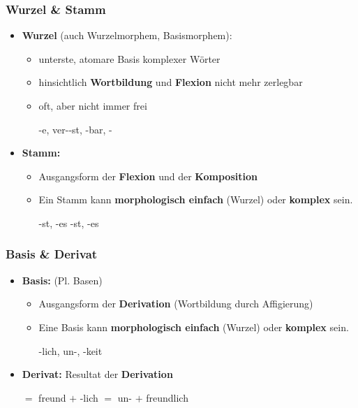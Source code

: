 \begin{frame}
\frametitle{Wurzel \& Stamm}

\begin{itemize}
	\item \textbf{Wurzel} (auch Wurzelmorphem, Basismorphem): 
	
	\begin{itemize}
		\item unterste, atomare Basis komplexer Wörter
		\item hinsichtlich \textbf{Wortbildung} und \textbf{Flexion} nicht mehr zerlegbar
		\item oft, aber nicht immer frei
		
		\ea {}-e, ver--st, -bar, -				
		\z 
	\end{itemize}


	\item \textbf{Stamm:}
	
	\begin{itemize}
		\item Ausgangsform der \textbf{Flexion} und der \textbf{Komposition}
		\item Ein Stamm kann \textbf{morphologisch einfach} (Wurzel) oder \textbf{komplex} sein.
	
		\ea 
			\ea {}-st, -es
			\ex {}-st, -es
			\z 
		\z 
	\end{itemize}
\end{itemize}

\end{frame}


\begin{frame}
\frametitle{Basis \& Derivat}

\begin{itemize}
	\item \textbf{Basis:} (Pl. Basen)
	
	\begin{itemize}
		\item Ausgangsform der \textbf{Derivation} (Wortbildung durch Affigierung)
		\item Eine Basis kann \textbf{morphologisch einfach} (Wurzel) oder \textbf{komplex} sein.
		
		\ea {}-lich, un-, -keit
		\z 

	\end{itemize}

	\item \textbf{Derivat:} Resultat der \textbf{Derivation}
	
	\ea 
		\ea {} $=$ freund $+$ -lich
		\ex {} $=$ un- $+$ freundlich
		\z 
	\z 

\end{itemize}

\end{frame}


